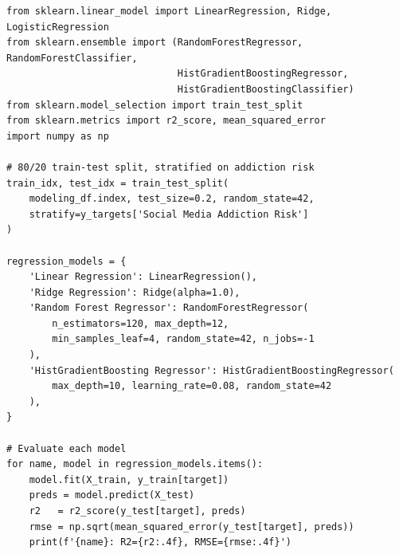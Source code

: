 \documentclass[12pt,a4paper]{article}
\begin{document}
\begin{verbatim}
from sklearn.linear_model import LinearRegression, Ridge, LogisticRegression
from sklearn.ensemble import (RandomForestRegressor, RandomForestClassifier,
                              HistGradientBoostingRegressor,
                              HistGradientBoostingClassifier)
from sklearn.model_selection import train_test_split
from sklearn.metrics import r2_score, mean_squared_error
import numpy as np
 
# 80/20 train-test split, stratified on addiction risk
train_idx, test_idx = train_test_split(
    modeling_df.index, test_size=0.2, random_state=42,
    stratify=y_targets['Social Media Addiction Risk']
)
 
regression_models = {
    'Linear Regression': LinearRegression(),
    'Ridge Regression': Ridge(alpha=1.0),
    'Random Forest Regressor': RandomForestRegressor(
        n_estimators=120, max_depth=12,
        min_samples_leaf=4, random_state=42, n_jobs=-1
    ),
    'HistGradientBoosting Regressor': HistGradientBoostingRegressor(
        max_depth=10, learning_rate=0.08, random_state=42
    ),
}
 
# Evaluate each model
for name, model in regression_models.items():
    model.fit(X_train, y_train[target])
    preds = model.predict(X_test)
    r2   = r2_score(y_test[target], preds)
    rmse = np.sqrt(mean_squared_error(y_test[target], preds))
    print(f'{name}: R2={r2:.4f}, RMSE={rmse:.4f}')
\end{verbatim}
 
\end{document}
